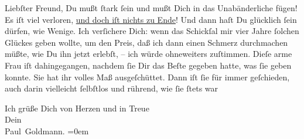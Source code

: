 \pstart
           Liebſter Freund, Du mußt{ }ſtark{ }ſein und mußt Dich in das Unabänderliche fügen! Es iſt
               viel verloren, \uline{und doch iſt nichts zu Ende}! Und dann
               haſt Du \label{K_L02871-8v}\label{K_L02871-8}
               glücklich{ }ſein dürfen, wie Wenige. Ich verſichere Dich: wenn das Schickſal mir vier
               Jahre{ }ſolchen Glückes geben wollte, um den Preis, daß ich dann einen Schmerz
               durchmachen müßte, wie Du ihn jetzt erlebſt, – ich würde ohneweiters zuſtimmen. Dieſe
               arme Frau iſt dahingegangen,
               nachdem{ }ſie Dir das Beſte gegeben hatte, was{ }ſie geben konnte. Sie hat ihr volles Maß
               ausgeſchüttet. Dann iſt{ }ſie für immer geſchieden, auch darin vielleicht{ }ſelbſtlos und
                  \strikeout{\textcolor{gray}{×}\-\textcolor{gray}{×}\-\textcolor{gray}{×}} rührend, wie{ }ſie{ }ſtets war{\dotsfive}\pend
           
\pstart
           Ich grüße Dich von Herzen und in Treue {\\[\baselineskip]}Dein {\\[\baselineskip]}\spacefill\mbox{Paul Goldmann.}\pend
           \leftskip=0em{}\endnumbering{}  \newcommand{\dateiname}{L02871}\newcommand{\titel}{Paul Goldmann an Arthur Schnitzler, 31. 3. [1899]}\newcommand{\editorInnen}{Martin Anton Müller und Laura Untner}
